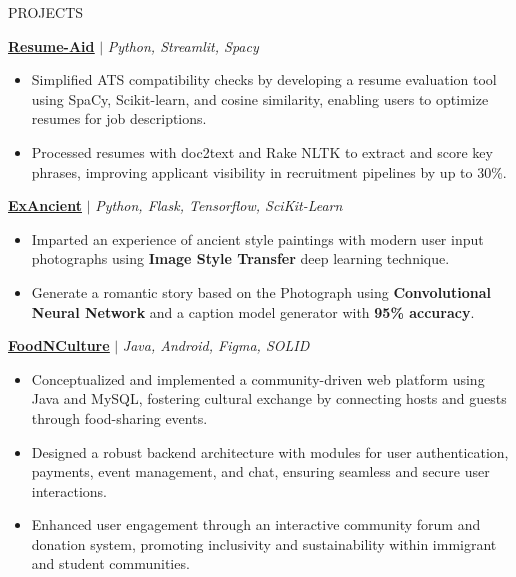\documentclass{resume} %
\begin{document}

\begin{rSection}{PROJECTS}
\vspace{0.05em}

\href{https://github.com/RutvikJ77/Resume-aid}{\textbf{\underline{Resume-Aid}}} $|$\textit{ Python, Streamlit, Spacy}
\begin{itemize}
    \item Simplified ATS compatibility checks by developing a resume evaluation tool using SpaCy, Scikit-learn, and cosine similarity, enabling users to optimize resumes for job descriptions.
    \item Processed resumes with doc2text and Rake NLTK to extract and score key phrases, improving applicant visibility in recruitment pipelines by up to 30\%.
\end{itemize}

\href{https://github.com/RutvikJ77/ExAncient}{\textbf{\underline{ExAncient}}} $|$\textit{ Python, Flask, Tensorflow, SciKit-Learn}
\begin{itemize}
    \item {Imparted an experience of ancient style paintings with modern user input photographs using \textbf{Image Style Transfer} deep learning technique.}
    \item {Generate a romantic story based on the Photograph using \textbf{Convolutional Neural Network} and a caption model generator with \textbf{95\% accuracy}.}
\end{itemize}

\href{https://github.com/RutvikJ77/FoodNCulture}{\textbf{\underline{FoodNCulture}}} $|$\textit{ Java, Android, Figma, SOLID}
\begin{itemize}
  \item Conceptualized and implemented a community-driven web platform using Java and MySQL, fostering cultural exchange by connecting hosts and guests through food-sharing events.
  \item Designed a robust backend architecture with modules for user authentication, payments, event management, and chat, ensuring seamless and secure user interactions.
  \item Enhanced user engagement through an interactive community forum and donation system, promoting inclusivity and sustainability within immigrant and student communities.
\end{itemize}


\end{rSection}
\end{document}
